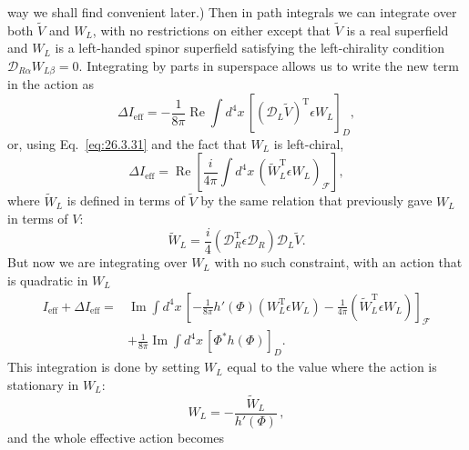 way we shall find convenient later.) Then in path integrals we can integrate
over both \(\widetilde V\) and \(W_L\), with no restrictions on either except
that \(\widetilde V\) is a real superfield and \(W_L\) is a left-handed
spinor superfield satisfying the left-chirality condition
\(\mathcal{D}_{R\alpha}W_{L\beta}=0\). Integrating by parts in superspace
allows us to write the new term in the action as
\begin{equation}
  \Delta I_{\mathrm{eff}}
  =-\frac{1}{8\pi}\operatorname{Re}\int d^4x\,
    \left[
      \left(\mathcal{D}_L\widetilde V\right)^{\mathrm T}
      \epsilon W_L
    \right]_D,
  \tag{29.5.26}\label{eq:29.5.26}
\end{equation}
or, using Eq.~\eqref{eq:26.3.31} and the fact that \(W_L\) is left-chiral,
\begin{equation}
  \Delta I_{\mathrm{eff}}
  =\operatorname{Re}\left[
    \frac{i}{4\pi}\int d^4x\,
    \left(\widetilde W_L^{\mathrm T}\epsilon W_L\right)_{\mathcal F}
  \right],
  \tag{29.5.27}\label{eq:29.5.27}
\end{equation}
where \(\widetilde W_L\) is defined in terms of \(\widetilde V\) by the same
relation that previously gave \(W_L\) in terms of \(V\):
\begin{equation}
  \widetilde W_L
  =\frac{i}{4}
    \left(\mathcal{D}_R^{\mathrm T}\epsilon\mathcal{D}_R\right)
    \mathcal{D}_L\widetilde V.
  \tag{29.5.28}\label{eq:29.5.28}
\end{equation}
But now we are integrating over \(W_L\) with no such constraint, with an
action that is quadratic in \(W_L\)
\begin{equation}
  \begin{aligned}
  I_{\mathrm{eff}}+\Delta I_{\mathrm{eff}}
  ={}&\operatorname{Im}\int d^4x\,
  \left[
    -\frac{1}{8\pi}h'(\Phi)
      \left(W_L^{\mathrm T}\epsilon W_L\right)
    -\frac{1}{4\pi}
      \left(\widetilde W_L^{\mathrm T}\epsilon W_L\right)
  \right]_{\mathcal F}
  \\
  &+\frac{1}{8\pi}\operatorname{Im}\int d^4x\,
    \left[\Phi^*h(\Phi)\right]_D.
  \end{aligned}
  \tag{29.5.29}\label{eq:29.5.29}
\end{equation}
This integration is done by setting \(W_L\) equal to the value where the
action is stationary in \(W_L\):
\begin{equation}
  W_L=-\frac{\widetilde W_L}{h'(\Phi)}\,,
  \tag{29.5.30}\label{eq:29.5.30}
\end{equation}
and the whole effective action becomes
